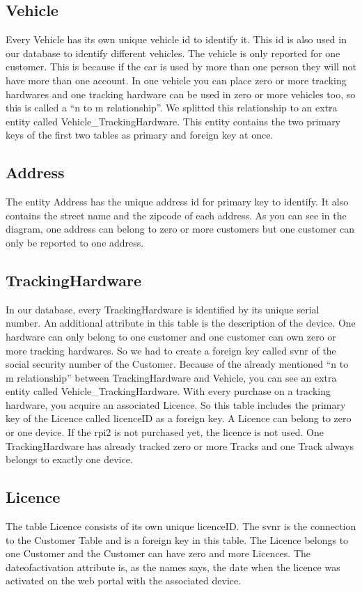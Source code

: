 \subsection{Vehicle}
Every Vehicle has its own unique vehicle id to identify it. This id is also used in our database to identify different vehicles. The vehicle is only reported for one customer. This is because if the car is used by more than one person they will not have more than one account. In one vehicle you can place zero or more tracking hardwares and one tracking hardware can be used in zero or more vehicles too, so this is called a “n to m relationship”. We splitted this relationship to an extra entity called Vehicle\_TrackingHardware. This entity contains the two primary keys of the first two tables as primary and foreign key at once.
\subsection{Address}
The entity Address has the unique address id for primary key to identify. It also contains the street name and the zipcode of each address. As you can see in the diagram, one address can belong to zero or more customers but one customer can only be reported to one address.
\subsection{TrackingHardware}
In our database, every TrackingHardware is identified by its unique serial number. An additional attribute in this table is the description of the device. One hardware can only belong to one customer and one customer can own zero or more tracking hardwares. So we had to create a foreign key called svnr of the social security number of the Customer. Because of the already mentioned “n to m relationship” between TrackingHardware and Vehicle, you can see an extra entity called Vehicle\_TrackingHardware. With every purchase on a tracking hardware, you acquire an associated Licence. So this table includes the primary key of the Licence called licenceID as a foreign key. A Licence can belong to zero or one device. If the \gls{rpi2} is not purchased yet, the licence is not used. One TrackingHardware has already tracked zero or more Tracks and one Track always belongs to exactly one device.
\subsection{Licence}
The table Licence consists of its own unique licenceID. The svnr is the connection to the Customer Table and is a foreign key in this table. The Licence belongs to one Customer and the Customer can have zero and more Licences. The dateofactivation attribute is, as the names says, the date when the licence was activated on the web portal with the associated device.
